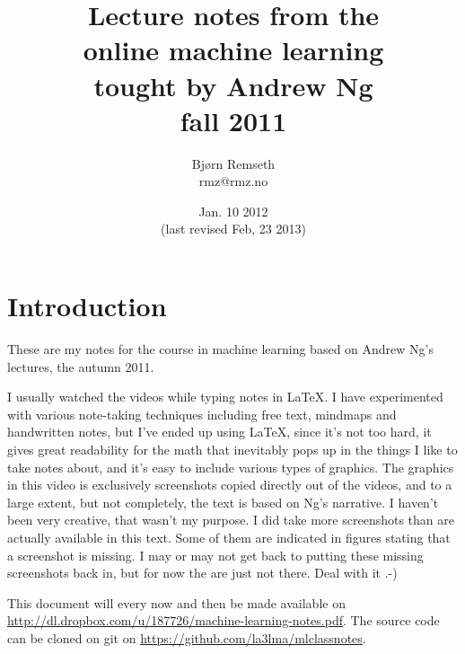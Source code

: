 \documentclass[a4, 12pt, english, USenglish]{scrreprt}
\begin{document}
\title{Lecture notes from the \\
online  machine learning\\
tought by Andrew Ng \\
fall 2011}

\author{Bj\o{}rn Remseth \\ rmz@rmz.no}

\date{Jan. 10 2012 \\ (last revised Feb, 23 2013)}
\maketitle
\tableofcontents



\begin{abstract}

\end{abstract}

\chapter*{Introduction}

These are my notes for the course in machine learning  based on Andrew
Ng's lectures, the autumn 2011.    

I usually watched the videos while typing notes in \LaTeX.  I have
experimented with various note-taking techniques including free text,
mindmaps and handwritten notes, but I've ended up using \LaTeX, since
it's not too hard, it gives great readability for the math that
inevitably pops up in the things I like to take notes about, and it's
easy to include various types of graphics.  The graphics in this video
is exclusively screenshots copied directly out of the videos, and to a
large extent, but not  completely, the text is based on Ng's
narrative.   I haven't been very creative, that wasn't my purpose.  I
did take more screenshots than are actually available in this text.
Some of them are indicated in figures stating that a screenshot is
missing.  I may or may not get back to putting these missing
screenshots back in, but for  now the are just not there.  Deal with
it .-)

This document will every now and then be made available on
\url{http://dl.dropbox.com/u/187726/machine-learning-notes.pdf}.   The
source code can be cloned on git on \url{https://github.com/la3lma/mlclassnotes}.
\end{document}
